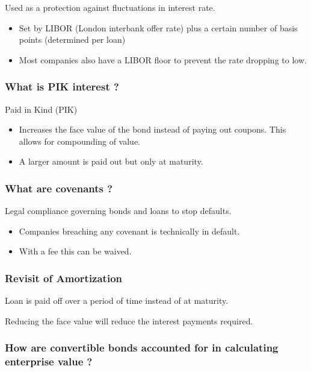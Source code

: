 \documentclass[11pt]{scrartcl} %
\begin{document}
Used as a protection against fluctuations in interest rate.

\begin{itemize}
	\item Set by LIBOR (London interbank offer rate) plus a certain number of basis points (determined per loan)
	\item Most companies also have a LIBOR floor to prevent the rate dropping to low.
\end{itemize}

\subsubsection{What is PIK interest ?}

Paid in Kind (PIK)

\begin{itemize}
	\item Increases the face value of the bond instead of paying out coupons. This allows for compounding of value.
	\item A larger amount is paid out but only at maturity.
\end{itemize}

\subsubsection{What are covenants ?}

Legal compliance governing bonds and loans to stop defaults.

\begin{itemize}
	\item Companies breaching any covenant is technically in default.
	\item With a fee this can be waived.
\end{itemize}

\subsubsection{Revisit of Amortization}

Loan is paid off over a period of time instead of at maturity.

Reducing the face value will reduce the interest payments required.

\subsubsection{How are convertible bonds accounted for in calculating enterprise value ?}
\end{document}
